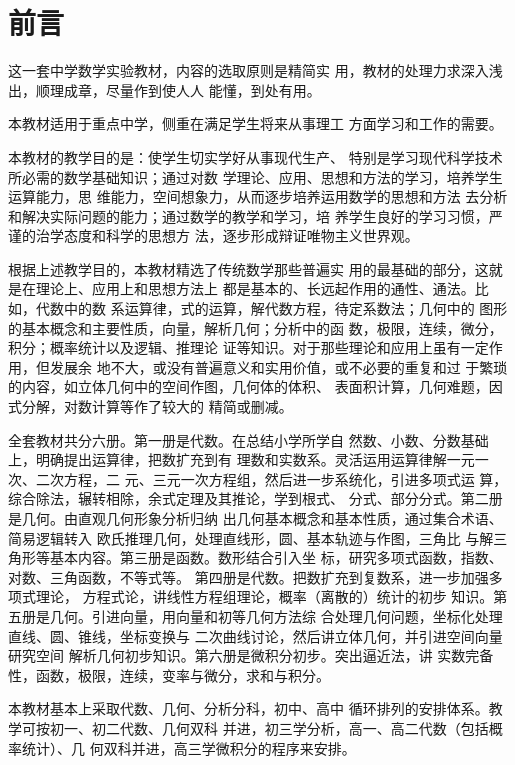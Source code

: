 \chapter{前言}

这一套中学数学实验教材，内容的选取原则是精简实
用，教材的处理力求深入浅出，顺理成章，尽量作到使人人
能懂，到处有用。

    本教材适用于重点中学，侧重在满足学生将来从事理工
方面学习和工作的需要。

    本教材的教学目的是：使学生切实学好从事现代生产、
特别是学习现代科学技术所必需的数学基础知识；通过对数
学理论、应用、思想和方法的学习，培养学生运算能力，思
维能力，空间想象力，从而逐步培养运用数学的思想和方法
去分析和解决实际问题的能力；通过数学的教学和学习，培
养学生良好的学习习惯，严谨的治学态度和科学的思想方
法，逐步形成辩证唯物主义世界观。

   根据上述教学目的，本教材精选了传统数学那些普遍实
用的最基础的部分，这就是在理论上、应用上和思想方法上
都是基本的、长远起作用的通性、通法。比如，代数中的数
系运算律，式的运算，解代数方程，待定系数法；几何中的
图形的基本概念和主要性质，向量，解析几何；分析中的函
数，极限，连续，微分，积分；概率统计以及逻辑、推理论
证等知识。对于那些理论和应用上虽有一定作用，但发展余
地不大，或没有普遍意义和实用价值，或不必要的重复和过
于繁琐的内容，如立体几何中的空间作图，几何体的体积、
表面积计算，几何难题，因式分解，对数计算等作了较大的
精简或删减。

    全套教材共分六册。第一册是代数。在总结小学所学自
然数、小数、分数基础上，明确提出运算律，把数扩充到有
理数和实数系。灵活运用运算律解一元一次、二次方程，二
元、三元一次方程组，然后进一步系统化，引进多项式运
算，综合除法，辗转相除，余式定理及其推论，学到根式、
分式、部分分式。第二册是几何。由直观几何形象分析归纳
出几何基本概念和基本性质，通过集合术语、简易逻辑转入
欧氏推理几何，处理直线形，圆、基本轨迹与作图，三角比
与解三角形等基本内容。第三册是函数。数形结合引入坐
标，研究多项式函数，指数、对数、三角函数，不等式等。
第四册是代数。把数扩充到复数系，进一步加强多项式理论，
方程式论，讲线性方程组理论，概率（离散的）统计的初步
知识。第五册是几何。引进向量，用向量和初等几何方法综
合处理几何问题，坐标化处理直线、圆、锥线，坐标变换与
二次曲线讨论，然后讲立体几何，并引进空间向量研究空间
解析几何初步知识。第六册是微积分初步。突出逼近法，讲
实数完备性，函数，极限，连续，变率与微分，求和与积分。

本教材基本上采取代数、几何、分析分科，初中、高中
循环排列的安排体系。教学可按初一、初二代数、几何双科
并进，初三学分析，高一、高二代数（包括概率统计）、几
何双科并进，高三学微积分的程序来安排。

